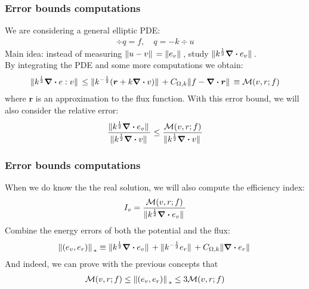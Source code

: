 \documentclass[t]{beamer}
\begin{document}
    \begin{frame}
        \frametitle{Error bounds computations}
        We are considering a general elliptic PDE:
        \begin{align*}
            \div q = f , \quad q =-k \div u
        \end{align*}
        Main idea: instead of measuring $\norm*{u-v} = \norm*{e_v}$, study $\norm*{k^{\frac{1}{2}}\div e_v}$. 
        \\ By integrating the PDE and some more computations we obtain:
        \begin{align*}
            \norm*{k^{\frac{1}{2}}\div e:v} \leq \norm*{k^{-\frac{1}{2}}(\bm{r}+k\div v)} + C_{\Omega,k}\norm*{f-\div \bm{r}} \equiv \mathcal{M}(v,r;f)
        \end{align*}
        where $\bm{r}$ is an approximation to the flux function.
        With this error bound, we will also consider the \alert{relative error}:
        \begin{align*}
            \frac{\norm*{k^{\frac{1}{2}}\div e_v}}{\norm*{k^{\frac{1}{2}}\div v}} \leq \frac{\mathcal{M}(v,r;f)}{\norm*{k^{\frac{1}{2}}\div v}}
        \end{align*}
        
    \end{frame}

    \begin{frame}
        \frametitle{Error bounds computations}
        When we do know the the real solution, we will also compute the \alert{efficiency index}:
        \begin{align*}
            I_v = \frac{\mathcal{M}(v,r;f)}{\norm*{k^{\frac{1}{2}}\div e_v}}
        \end{align*}
        Combine the energy errors of both the potential and the flux:
        \begin{align*}
            \norm*{(e_v,e_r)}_{*} \equiv \norm*{k^{\frac{1}{2}}\div e_v} + \norm*{k^{-\frac{1}{2}}e_r} + C_{\Omega,k}\norm*{\div e_r}
        \end{align*} 
        And indeed, we can prove with the previous concepts that 
        \begin{align*}
            \mathcal{M}(v,r;f) \leq  \norm*{(e_v,e_r)}_{*}  \leq 3\mathcal{M}(v,r;f)
        \end{align*}
    \end{frame}
\end{document}
